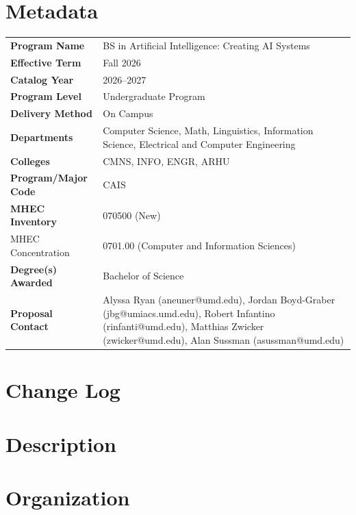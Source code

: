 \documentclass[
10pt, %
a4paper, %
oneside, %
headinclude,footinclude, %
BCOR5mm, %
]{scrartcl}
\begin{document}
\section{Metadata}

\begin{tabular}{lp{8cm}}
\toprule
\textbf{Program Name} & BS in Artificial Intelligence: Creating AI Systems \\
\textbf{Effective Term} & Fall 2026 \\
\textbf{Catalog Year} & 2026--2027 \\
\textbf{Program Level} & Undergraduate Program \\
\textbf{Delivery Method} & On Campus \\
\textbf{Departments} & Computer Science, Math, Linguistics, Information Science, Electrical and Computer Engineering \\
\textbf{Colleges} & CMNS, INFO, ENGR, ARHU \\
\textbf{Program/Major Code} & CAIS \\
\textbf{MHEC Inventory} & 070500 (New) \\
{MHEC Concentration} & 0701.00 (Computer and Information Sciences) \\  %
\textbf{Degree(s) Awarded} & Bachelor of Science \\
\textbf{Proposal Contact} & Alyssa Ryan (aneuner@umd.edu), Jordan Boyd-Graber (jbg@umiacs.umd.edu), Robert Infantino (rinfanti@umd.edu), Matthias Zwicker (zwicker@umd.edu), Alan Sussman (asussman@umd.edu)  \\
\bottomrule
\end{tabular}

\section{Change Log}



\section{Description}



\section{Organization}

\end{document}
